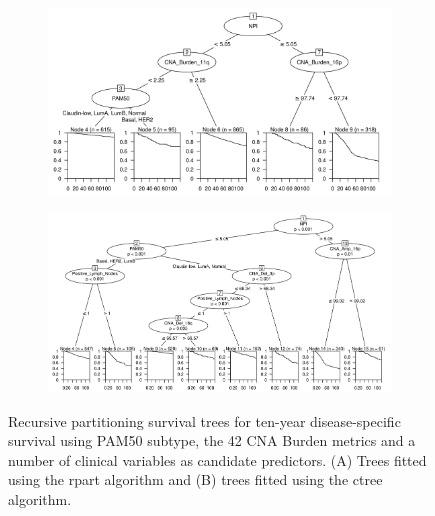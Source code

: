 \begin{figure}[!h]
\centering

\vspace{1cm}

\begin{subfigure}{\textwidth}
\subcaption{}
\includegraphics[width=1\textwidth]{../figures/Chapter_3/Clin_PA_PartyKit_Survival_Burden_TenYearDSS_PAM50.png}
\end{subfigure}

\vspace{2cm}

\begin{subfigure}{\textwidth}
\subcaption{}
\includegraphics[width=1\textwidth]{../figures/Chapter_3/Clin_PA_Ctree_Survival_Burden_TenYearDSS_PAM50.png}
\end{subfigure}

\vspace{1cm}

\caption[Recursive partitioning survival trees for ten-year disease-specific survival using PAM50 subtype, the 42 CNA Burden metrics and a number of clinical variables as candidate predictors.]{Recursive partitioning survival trees for ten-year disease-specific survival using PAM50 subtype, the 42 CNA Burden metrics and a number of clinical variables as candidate predictors. (A) Trees fitted using the rpart algorithm and (B) trees fitted using the ctree algorithm.}
\label{fig:PA_PAM50_CNA_Burden_TenYearDSS_Clin}
\end{figure}


